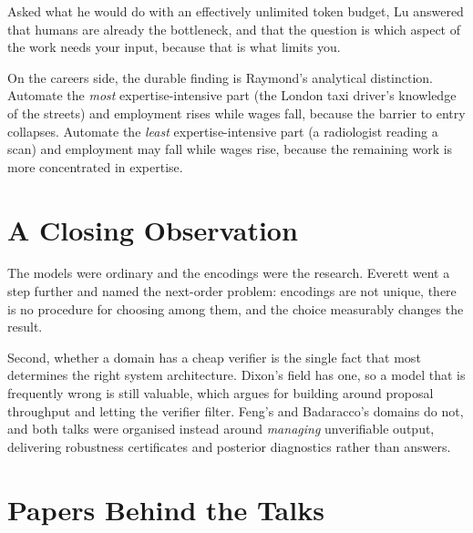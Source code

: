 \documentclass[11pt]{article}
\begin{document}
Asked what he would do with an effectively unlimited token budget, Lu answered that humans are already the bottleneck, and that the question is which aspect of the work needs your input, because that is what limits you.

On the careers side, the durable finding is Raymond's analytical distinction. Automate the \emph{most} expertise-intensive part (the London taxi driver's knowledge of the streets) and employment rises while wages fall, because the barrier to entry collapses. Automate the \emph{least} expertise-intensive part (a radiologist reading a scan) and employment may fall while wages rise, because the remaining work is more concentrated in expertise.

\section*{A Closing Observation}

The models were ordinary and the encodings were the research. Everett went a step further and named the next-order problem: encodings are not unique, there is no procedure for choosing among them, and the choice measurably changes the result. 

Second, whether a domain has a cheap verifier is the single fact that most determines the right system architecture. Dixon's field has one, so a model that is frequently wrong is still valuable, which argues for building around proposal throughput and letting the verifier filter. Feng's and Badaracco's domains do not, and both talks were organised instead around \emph{managing} unverifiable output, delivering robustness certificates and posterior diagnostics rather than answers.

\section*{Papers Behind the Talks}
\end{document}
